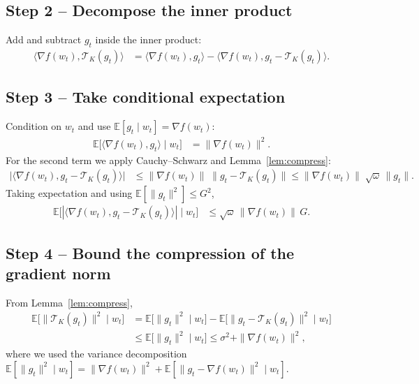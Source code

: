 \documentclass{article}
\newcommand{\TopK}{\mathcal{T}_K}
\newcommand{\E}{\mathbb{E}}
\begin{document}
\subsection*{Step 2 – Decompose the inner product}
Add and subtract $g_t$ inside the inner product:
\begin{align}
\langle\nabla f(w_t),\TopK(g_t)\rangle
&=\langle\nabla f(w_t),g_t\rangle
  -\langle\nabla f(w_t),g_t-\TopK(g_t)\rangle.
\tag{Step 2}
\end{align}

\subsection*{Step 3 – Take conditional expectation}
Condition on $w_t$ and use $\E[g_t\mid w_t]=\nabla f(w_t)$:
\begin{align}
\E\!\big[\langle\nabla f(w_t),g_t\rangle\mid w_t\big]
&=\|\nabla f(w_t)\|^{2}.
\tag{Step 3}
\end{align}
For the second term we apply Cauchy–Schwarz and Lemma~\ref{lem:compress}:
\begin{align}
\big|\langle\nabla f(w_t),g_t-\TopK(g_t)\rangle\big|
&\le \|\nabla f(w_t)\|\;\|g_t-\TopK(g_t)\|
\le \|\nabla f(w_t)\|\;\sqrt{\omega}\,\|g_t\|.
\tag{Step 4}
\end{align}
Taking expectation and using $\E[\|g_t\|^{2}]\le G^{2}$,
\begin{align}
\E\!\big[|\langle\nabla f(w_t),g_t-\TopK(g_t)\rangle|\mid w_t\big]
&\le \sqrt{\omega}\,\|\nabla f(w_t)\|\,G.
\tag{Step 5}
\end{align}

\subsection*{Step 4 – Bound the compression of the gradient norm}
From Lemma~\ref{lem:compress},
\begin{align}
\E\!\big[\|\TopK(g_t)\|^{2}\mid w_t\big]
&= \E\!\big[\|g_t\|^{2}\mid w_t\big]
   -\E\!\big[\|g_t-\TopK(g_t)\|^{2}\mid w_t\big] \nonumber\\
&\le \E\!\big[\|g_t\|^{2}\mid w_t\big]
   \le \sigma^{2}+\|\nabla f(w_t)\|^{2},
\tag{Step 6}
\end{align}
where we used the variance decomposition
$\E[\|g_t\|^{2}\mid w_t]=\|\nabla f(w_t)\|^{2}+\E[\|g_t-\nabla f(w_t)\|^{2}\mid w_t]$.
\end{document}
